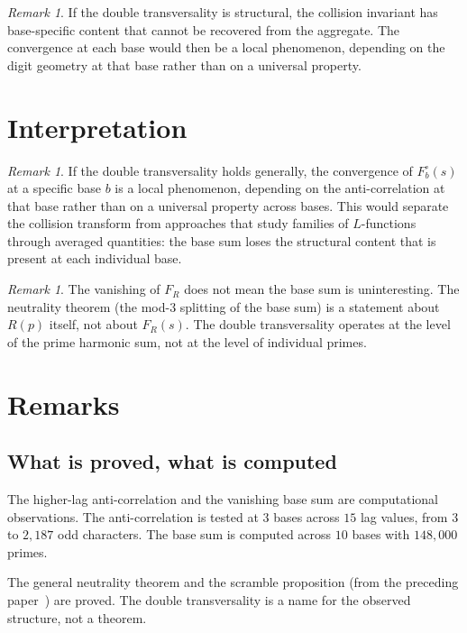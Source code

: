 \documentclass[12pt]{amsart}
\theoremstyle{definition}
\theoremstyle{remark}
\newtheorem{remark}[theorem]{Remark}
\begin{document}
\begin{remark}
If the double transversality is structural, the
collision invariant has base-specific content that
cannot be recovered from the aggregate. The
convergence at each base would then be a local
phenomenon, depending on the digit geometry at that
base rather than on a universal property.
\end{remark}

\section{Interpretation}

\begin{remark}
If the double transversality holds generally, the
convergence of $F^{\circ}_b(s)$ at a specific base $b$
is a local phenomenon, depending on the anti-correlation
at that base rather than on a universal property across
bases. This would separate the collision transform from
approaches that study families of $L$-functions through
averaged quantities: the base sum loses the structural
content that is present at each individual base.
\end{remark}

\begin{remark}
The vanishing of $F_R$ does not mean the base sum is
uninteresting. The neutrality theorem (the mod-$3$
splitting of the base sum) is a statement about $R(p)$
itself, not about $F_R(s)$. The double transversality
operates at the level of the prime harmonic sum, not
at the level of individual primes.
\end{remark}

\section{Remarks}

\subsection*{What is proved, what is computed}

The higher-lag anti-correlation and the vanishing base
sum are computational observations. The anti-correlation
is tested at $3$ bases across $15$ lag values, from $3$
to $2{,}187$ odd characters. The base sum is computed
across $10$ bases with $148{,}000$ primes.

The general neutrality theorem and the scramble
proposition (from the preceding paper~\cite{paper19})
are proved. The double transversality is a name for
the observed structure, not a theorem.
\end{document}
